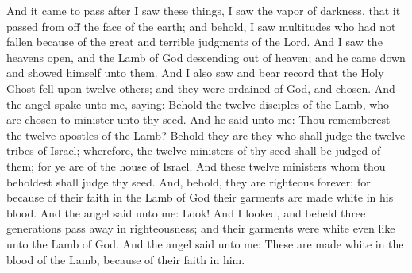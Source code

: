 And it came to pass after I saw these things, I saw the vapor of darkness, that it passed from off the face of the earth; and behold, I saw multitudes who had not fallen because of the great and terrible judgments of the Lord.
\bverse \iffalse And I saw the heavens open, and the Lamb of God descending out of heaven; and he came down and showed himself unto them. \fi
And I saw the heavens open, and the Lamb of God descending out of heaven; and he came down and showed himself unto them.
\bverse \iffalse And I also saw and bear record that the Holy Ghost fell upon twelve others; and they were ordained of God, and chosen. \fi
And I also saw and bear record that the Holy Ghost fell upon twelve others; and they were ordained of God, and chosen.
\bverse \iffalse And the angel spake unto me, saying: Behold the twelve disciples of the Lamb, who are chosen to minister unto thy seed. \fi
And the angel spake unto me, saying: Behold the twelve disciples of the Lamb, who are chosen to minister unto thy seed.
\bverse \iffalse And he said unto me: Thou rememberest the twelve apostles of the Lamb? Behold they are they who shall judge the twelve tribes of Israel; wherefore, the twelve ministers of thy seed shall be judged of them; for ye are of the house of Israel. \fi
And he said unto me: Thou rememberest the twelve apostles of the Lamb? Behold they are they who shall judge the twelve tribes of Israel; wherefore, the twelve ministers of thy seed shall be judged of them; for ye are of the house of Israel.
\bverse \iffalse And these twelve ministers whom thou beholdest shall judge thy seed. And, behold, they are righteous forever; for because of their faith in the Lamb of God their garments are made white in his blood. \fi
And these twelve ministers whom thou beholdest shall judge thy seed. And, behold, they are righteous forever; for because of their faith in the Lamb of God their garments are made white in his blood.
\bverse \iffalse And the angel said unto me: Look! And I looked, and beheld three generations pass away in righteousness; and their garments were white even like unto the Lamb of God. And the angel said unto me: These are made white in the blood of the Lamb, because of their faith in him. \fi
And the angel said unto me: Look! And I looked, and beheld three generations pass away in righteousness; and their garments were white even like unto the Lamb of God. And the angel said unto me: These are made white in the blood of the Lamb, because of their faith in him.
